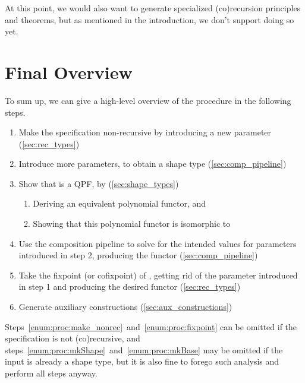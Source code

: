 At this point, we would also want to generate specialized (co)recursion principles and 
theorems, but as mentioned in the introduction, we don't support doing so yet.


\section{Final Overview}%
\label{sec:procedure:overview}

To sum up, we can give a high-level overview of the procedure in the following steps.
\begin{enumerate}
  \item\label{enum:proc:make_nonrec}
    Make the specification non-recursive by introducing a new parameter (\cref{sec:rec_types})
  \item\label{enum:proc:mkShape} 
    Introduce more parameters, to obtain a shape type  (\cref{sec:comp_pipeline})
  \item\label{enum:proc:mkQpf} 
    Show that  is a QPF, by (\cref{sec:shape_types})
        \begin{enumerate}
          \item Deriving an equivalent polynomial functor, and
          \item Showing that this polynomial functor is isomorphic to 
        \end{enumerate}
  \item\label{enum:proc:mkBase} 
    Use the composition pipeline to solve for the intended values for parameters introduced in step 2, producing the  functor (\cref{sec:comp_pipeline})
  \item\label{enum:proc:fixpoint} 
    Take the fixpoint (or cofixpoint) of , getting rid of the parameter introduced in step 1 
    and producing the desired functor (\cref{sec:rec_types})
  \item\label{enum:proc:aux} 
    Generate auxiliary constructions (\cref{sec:aux_constructions})
\end{enumerate}

Steps~\ref{enum:proc:make_nonrec}~and~\ref{enum:proc:fixpoint} can be omitted if the specification is not (co)recursive, and steps~\ref{enum:proc:mkShape}~and~\ref{enum:proc:mkBase} may be omitted
if the input is already a shape type, but it is also fine to forego such analysis and perform all steps anyway.


